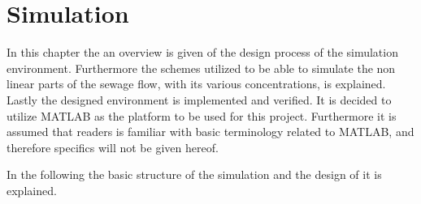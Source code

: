 \chapter{Simulation}\label{ch:simulation}
In this chapter the an overview is given of the design process of the simulation environment. Furthermore the schemes utilized to be able to simulate the non linear parts of the sewage flow, with its various concentrations, is explained. Lastly the designed environment is implemented and verified. It is decided to utilize MATLAB as the platform to be used for this project. Furthermore it is assumed that readers is familiar with basic terminology related to MATLAB, and therefore specifics will not be given hereof.

In the following the basic structure of the simulation and the design of it is explained.